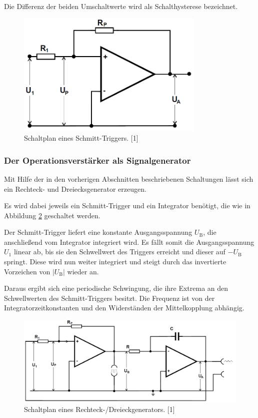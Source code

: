 \documentclass[]{scrartcl}
\begin{document}
Die Differenz der beiden Umschaltwerte wird als Schalthysterese bezeichnet.
\begin{figure}[H]
\centering
\includegraphics[width=9cm]{images/schaltplan_schmitt_trigger.png}
\caption{Schaltplan eines Schmitt-Triggers. [1]}
\label{fig:schalplan_schmitt_trigger}
\end{figure}


\subsubsection{Der Operationsverstärker als Signalgenerator}
Mit Hilfe der in den vorherigen Abschnitten beschriebenen Schaltungen lässt sich ein Rechteck- und Dreiecksgenerator erzeugen. 

Es wird dabei jeweils ein Schmitt-Trigger und ein Integrator benötigt, die wie in Abbildung \ref{fig:schalplan_generator} geschaltet werden.

Der Schmitt-Trigger liefert eine konstante Ausgangsspannung $U_\text{B}$, die anschließend vom Integrator integriert wird. Es fällt somit die Ausgangsspannung $U_1$ linear ab, bis sie den Schwellwert des Triggers erreicht und dieser auf $-U_\text{B}$ springt. Diese wird nun weiter integriert und steigt durch das invertierte Vorzeichen von $\left|U_\text{B} \right|$ wieder an.

Daraus ergibt sich eine periodische Schwingung, die ihre Extrema an den Schwellwerten des Schmitt-Triggers besitzt. Die Frequenz ist von der Integratorzeitkonstanten und den Widerständen der Mittelkopplung abhängig.
\begin{figure}[H]
\centering
\includegraphics[width=13.0cm]{images/schaltplan_generator.png}
\caption{Schaltplan eines Rechteck-/Dreieckgenerators. [1]}
\label{fig:schalplan_generator}
\end{figure}
\end{document}
